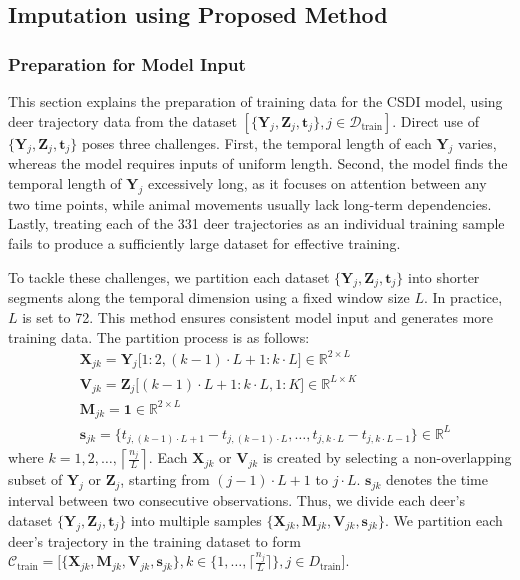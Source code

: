\documentclass[11pt]{article}
\begin{document}
\subsection{Imputation using Proposed Method}
\subsubsection{Preparation for Model Input}\label{sec: model training}
This section explains the preparation of training data for the CSDI model, using deer trajectory data from the dataset $[\{\bm{Y}_j,\bm{Z}_j,\bm{t}_j\},j\in \mathcal{D}_{\mathrm{train}}]$. Direct use of $\{\bm{Y}_j,\bm{Z}_j,\bm{t}_j\}$ poses three challenges. First, the temporal length of each $\bm{Y}_j$ varies, whereas the model requires inputs of uniform length. Second, the model finds the temporal length of $\bm{Y}_j$ excessively long, as it focuses on attention between any two time points, while animal movements usually lack long-term dependencies. Lastly, treating each of the 331 deer trajectories as an individual training sample fails to produce a sufficiently large dataset for effective training.


To tackle these challenges, we partition each dataset $\{\bm{Y}_j,\bm{Z}_j,\bm{t}_j\}$ into shorter segments along the temporal dimension using a fixed window size $L$. In practice, $L$ is set to 72. This method ensures consistent model input and generates more training data. The partition process is as follows:
\begin{align}
	&\bm{X}_{jk} = \bm{Y}_j\big[1:2,(k-1)\cdot L+1: k\cdot L\big]\in \mathbb{R}^{2\times L}\\
	&\bm{V}_{jk} = \bm{Z}_j\big[(k-1)\cdot L+1: k\cdot L, 1:K\big]\in \mathbb{R}^{L\times K}\\
	&\bm{M}_{jk}=\mathbf{1}\in \mathbb{R}^{2 \times L}\\
	&\bm{s}_{jk}=\{t_{j,(k-1)\cdot L+1}-t_{j,(k-1)\cdot L},\ldots, t_{j,k\cdot L}-t_{j,k\cdot L-1}\}\in \mathbb{R}^L
\end{align}
where $k=1,2,\ldots,\left\lceil\frac{n_j}{L}\right\rceil$. Each $\bm{X}_{jk}$ or $\bm{V}_{jk}$ is created by selecting a non-overlapping subset of $\bm{Y}_j$ or $\bm{Z}_j$, starting from $(j-1)\cdot L+1$ to $j\cdot L$. $\bm{s}_{jk}$ denotes the time interval between two consecutive observations. Thus, we divide each deer's dataset $\{\bm{Y}_j,\bm{Z}_j,\bm{t}_j\}$ into multiple samples $\{\bm{X}_{jk},\bm{M}_{jk},\bm{V}_{jk}, \bm{s}_{jk}\}$. We partition each deer's trajectory in the training dataset to form $\mathcal{C}_{\mathrm{train}}=\big[\{\bm{X}_{jk},\bm{M}_{jk},\bm{V}_{jk}, \bm{s}_{jk}\}, k\in \{1,\ldots, \lceil \frac{n_j}{L}\rceil\},j\in D_{\mathrm{train}}\big]$.
\end{document}
